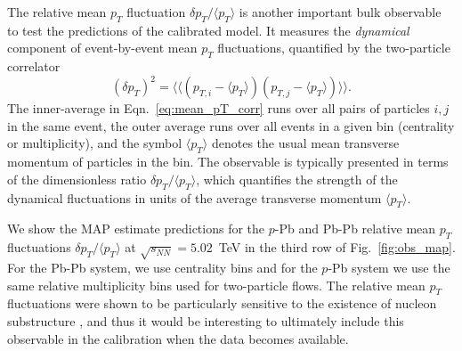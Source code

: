 \documentclass[aps,prc,reprint,amsmath,nofootinbib]{revtex4-1}
\newcommand{\sqrts}{\sqrt{s_{NN}}}
\begin{document}
The relative mean $p_T$ fluctuation $\delta p_T / \langle p_T \rangle$ is another important bulk observable to test the predictions of the calibrated model.
It measures the \emph{dynamical} component of event-by-event mean $p_T$ fluctuations, quantified by the two-particle correlator
\begin{equation}
  (\delta p_T)^2 = \langle \langle (p_{T,i} - \langle p_T \rangle) (p_{T,j} - \langle p_T \rangle) \rangle \rangle.
  \label{eq:mean_pT_corr}
\end{equation}
The inner-average in Eqn.~\ref{eq:mean_pT_corr} runs over all pairs of particles $i,j$ in the same event, the outer average runs over all events in a given bin (centrality or multiplicity), and the symbol $\langle p_T \rangle$ denotes the usual mean transverse momentum of particles in the bin.
The observable is typically presented in terms of the dimensionless ratio $\delta p_T / \langle p_T \rangle$, which quantifies the strength of the dynamical fluctuations in units of the average transverse momentum $\langle p_T \rangle$.

We show the MAP estimate predictions for the $p$-Pb and Pb-Pb relative mean $p_T$ fluctuations $\delta p_T / \langle p_T \rangle$ at $\sqrts=5.02$~TeV in the third row of Fig.~\ref{fig:obs_map}.
For the Pb-Pb system, we use centrality bins and for the $p$-Pb system we use the same relative multiplicity bins used for two-particle flows.
The relative mean $p_T$ fluctuations were shown to be particularly sensitive to the existence of nucleon substructure \cite{Bozek:2017elk}, and thus it would be interesting to ultimately include this observable in the calibration when the data becomes available.
\end{document}
